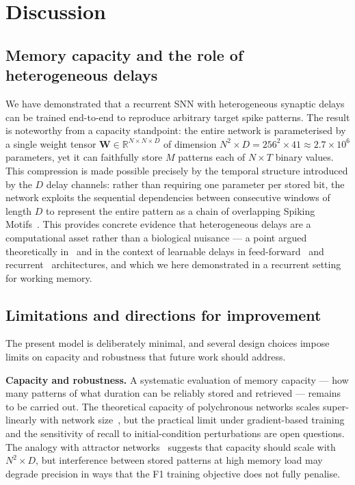 \documentclass{article}
\begin{document}
\section{Discussion}

\subsection{Memory capacity and the role of heterogeneous delays}

We have demonstrated that a recurrent SNN with heterogeneous synaptic delays can be trained end-to-end to reproduce arbitrary target spike patterns. The result is noteworthy from a capacity standpoint: the entire network is parameterised by a single weight tensor $\mathbf{W} \in \mathbb{R}^{N \times N \times D}$ of dimension $N^2 \times D = 256^2 \times 41 \approx 2.7 \times 10^6$ parameters, yet it can faithfully store $M$ patterns each of $N \times T$ binary values. This compression is made possible precisely by the temporal structure introduced by the $D$ delay channels: rather than requiring one parameter per stored bit, the network exploits the sequential dependencies between consecutive windows of length $D$ to represent the entire pattern as a chain of overlapping Spiking Motifs~\citep{Perrinet2023,Kronland-Martinet2025}. This provides concrete evidence that heterogeneous delays are a computational asset rather than a biological nuisance --- a point argued theoretically in~\citet{Izhikevich2006} and in the context of learnable delays in feed-forward~\citet{Grimaldi2023a,Hammouamri2023} and recurrent~\citet{Queant2025} architectures, and which we here demonstrated in a recurrent setting for working memory.

\subsection{Limitations and directions for improvement}

The present model is deliberately minimal, and several design choices impose limits on capacity and robustness that future work should address.

\textbf{Capacity and robustness.}
A systematic evaluation of memory capacity --- how many patterns of what duration can be reliably stored and retrieved --- remains to be carried out. The theoretical capacity of polychronous networks scales super-linearly with network size~\citep{Izhikevich2006}, but the practical limit under gradient-based training and the sensitivity of recall to initial-condition perturbations are open questions. The analogy with attractor networks~\citep{Szatmary2010} suggests that capacity should scale with $N^2 \times D$, but interference between stored patterns at high memory load may degrade precision in ways that the F1 training objective does not fully penalise.
\end{document}
